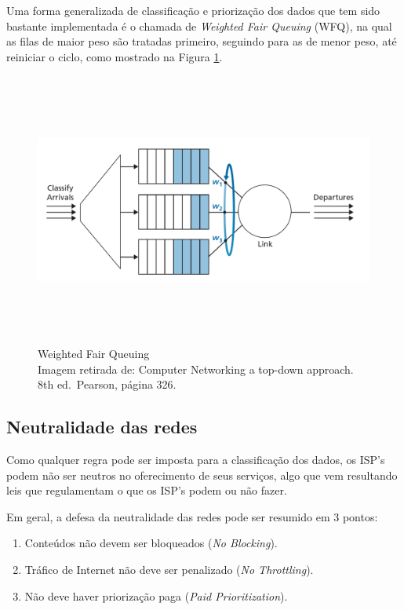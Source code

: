 Uma forma generalizada de classificação e priorização dos dados que tem
sido bastante implementada é o chamada de \emph{Weighted Fair Queuing}
(WFQ), na qual as filas de maior peso são tratadas primeiro, seguindo
para as de menor peso, até reiniciar o ciclo, como mostrado na Figura
\ref{fig:Weighted Fair Queuing}.


\begin{figure}[h!]
\centering
\includegraphics[keepaspectratio, width=12cm, height=9cm]{imagens/14/14 - WFQ.png}
\caption{Weighted Fair Queuing \\
Imagem retirada de: Computer Networking a top-down approach. 8th
ed.~Pearson, página 326. \\}
\label{fig:Weighted Fair Queuing}
\end{figure}



\hypertarget{neutralidade-das-redes}{%
\subsection{Neutralidade das redes}\label{neutralidade-das-redes}}

Como qualquer regra pode ser imposta para a classificação dos dados, os
ISP's podem não ser neutros no oferecimento de seus serviços, algo que
vem resultando leis que regulamentam o que os ISP's podem ou não fazer.

Em geral, a defesa da neutralidade das redes pode ser resumido em 3
pontos:

\begin{enumerate}
\def\labelenumi{\arabic{enumi}.}
\tightlist
\item
  Conteúdos não devem ser bloqueados (\emph{No Blocking}).
\item
  Tráfico de Internet não deve ser penalizado (\emph{No Throttling}).
\item
  Não deve haver priorização paga (\emph{Paid Prioritization}).
\end{enumerate}

